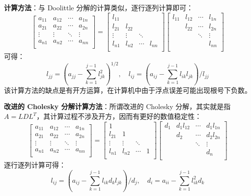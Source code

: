 \noindent\textbf{计算方法}：与 Doolittle 分解的计算类似，逐行逐列计算即可：
\[
    \begin{bmatrix}
    a_{11}&a_{12}&\cdots&a_{1n}\\
    a_{21}&a_{22}&\cdots&a_{2n}\\
    \vdots&\vdots&\ddots&\vdots\\
    a_{n1}&a_{n2}&\cdots&a_{nn}\\
    \end{bmatrix}=
    \begin{bmatrix}
    l_{11}&&&\\
    l_{21}&l_{22}&&\\
    \vdots&\vdots&\ddots&\\
    l_{n1}&l_{n2}&\cdots&l_{nn}\\
    \end{bmatrix}
    \begin{bmatrix}
    l_{11}&l_{12}&\cdots&l_{1n}\\
    &l_{22}&\cdots&l_{2n}\\
    &&\ddots&\vdots\\
    &&&l_{nn}\\
\end{bmatrix}
\]
可得：
\[
    l_{jj}=\left(a_{jj}-\sum_{k=1}^{j-1}l_{jk}^2\right)^{1/2},\quad l_{ij}=\left(a_{ij}-\sum_{k=1}^{j-1}l_{ik}l_{jk}\right)/l_{jj}
\]
该计算方法的缺点是有开方运算，在计算机中由于浮点误差可能出现根号下负数。

\vskip 10pt \noindent\textbf{改进的 Cholesky 分解计算方法}：所谓改进的 Cholesky 分解，其实就是指 $A=LDL^T$，其计算过程不涉及开方，因而有更好的数值稳定性：
\[
    \begin{bmatrix}
    a_{11}&a_{12}&\cdots&a_{1n}\\
    a_{21}&a_{22}&\cdots&a_{2n}\\
    \vdots&\vdots&\ddots&\vdots\\
    a_{n1}&a_{n2}&\cdots&a_{nn}\\
    \end{bmatrix}=
    \begin{bmatrix}
    1&&&\\
    l_{21}&1&&\\
    \vdots&\vdots&\ddots&\\
    l_{n1}&l_{n2}&\cdots&1\\
    \end{bmatrix}
    \begin{bmatrix}
    d_1&d_1l_{12}&\cdots&d_1l_{1n}\\
    &d_2&\cdots&d_2l_{2n}\\
    &&\ddots&\vdots\\
    &&&d_n\\
    \end{bmatrix}
\]
逐行逐列计算可得：
\[
    l_{ij}=\left(a_{ij}-\sum_{k=1}^{j-1}l_{ik}d_kl_{jk}\right)/d_j,\quad d_i=a_{ii}-\sum_{k=1}^{j-1}l_{ik}^2d_k
\]

